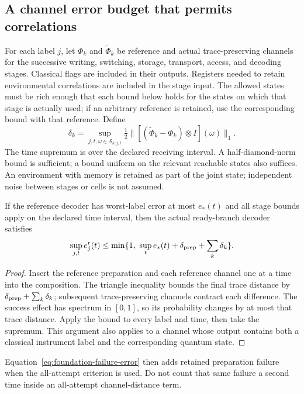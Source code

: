 \subsection{A channel error budget that permits correlations}
For each label $j$, let $\Phi_k$ and $\widetilde\Phi_k$ be reference and actual
trace-preserving channels for the successive writing, switching, storage,
transport, access, and decoding stages. Classical flags are included in their
outputs. Registers needed to retain environmental correlations are included
in the stage input. The allowed states must be rich enough that each bound
below holds for the states on which that stage is actually used; if an
arbitrary reference is retained, use the corresponding bound with that
reference. Define
\begin{equation}
 \delta_k=\sup_{j,t,\omega\in\mathcal S_{k,j,t}}
  \tfrac12\|[(\widetilde\Phi_k-\Phi_k)\otimes I](\omega)\|_1.
 \label{eq:foundation-stage-error}
\end{equation}
The time supremum is over the declared receiving interval. A half-diamond-norm
bound is sufficient; a bound uniform on the relevant reachable states also
suffices. An environment with memory is retained as part of the joint state;
independent noise between stages or cells is not assumed.

\begin{proposition}
If the reference decoder has worst-label error at most $e_*(t)$ and all
stage bounds apply on the declared time interval, then the actual ready-branch
decoder satisfies
\begin{equation}
 \sup_{j,t} e_j^{\rm r}(t)
 \le \min\{1,\ \sup_t e_*(t)+\delta_{\rm prep}+\sum_k\delta_k\}.
 \label{eq:foundation-error-budget}
\end{equation}
\end{proposition}
\begin{proof}
Insert the reference preparation and each reference channel one at a time
into the composition. The triangle inequality bounds the final trace
distance by $\delta_{\rm prep}+\sum_k\delta_k$; subsequent trace-preserving
channels contract each difference. The success effect has spectrum in
$[0,1]$, so its probability changes by at most that trace distance. Apply the
bound to every label and time, then take the supremum. This argument also
applies to a channel whose output contains both a classical instrument label
and the corresponding quantum state.
\end{proof}
Equation~\eqref{eq:foundation-failure-error} then adds retained preparation
failure when the all-attempt criterion is used. Do not count that same
failure a second time inside an all-attempt channel-distance term.

